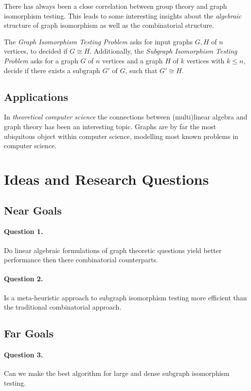\documentclass[12pt]{article}
\begin{document}
There has always been a close correlation between group theory and graph isomorphism testing. This leads to some interesting insights about the \textit{algebraic} structure of graph isomorphism as well as the combinatorial structure.

The \textit{Graph Isomorphism Testing Problem} asks for input graphs $G,H$ of $n$ vertices, to decided if $G\cong H$. Additionally, the \textit{Subgraph Isomorphism Testing Problem} asks for a graph $G$ of $n$ vertices and a graph $H$ of $k$ vertices with $k \leq n$, decide if there exists a subgraph $G'$ of $G$, such that $G'\cong H$.

\subsection{Applications}

In \textit{theoretical computer science} the connections between (multi)linear algebra and graph theory has been an interesting topic. Graphs are by far the most ubiquitous object within computer science, modelling most known problems in computer science.

\section{Ideas and Research Questions}

\subsection{Near Goals}

\paragraph{Question 1.} Do linear algebraic formulations of graph theoretic questions yield better performance then there combinatorial counterparts.

\paragraph{Question 2.} Is a meta-heuristic approach to subgraph isomorphism testing more efficient than the traditional combinatorial approach.

\subsection{Far Goals}

\paragraph{Question 3.} Can we make the best algorithm for large and dense subgraph isomorphism testing.
\end{document}
